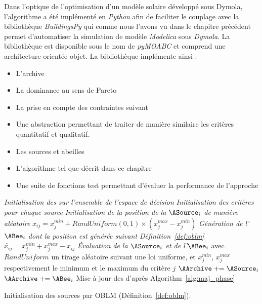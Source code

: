 Dans l’optique de l’optimisation d’un modèle solaire développé sous Dymola, l’algorithme
a été implémenté en \emph{Python} afin de faciliter le couplage avec la bibliothèque
\emph{BuildingsPy} qui comme nous l’avons vu dans le chapitre précédent permet d’automatiser
la simulation de modèle \emph{Modelica} sous \emph{Dymola}. La bibliothèque est
disponible sous le nom de \emph{pyMOABC} et comprend une architecture orientée objet.
La bibliothèque implémente ainsi :
\begin{itemize}
  \item L’archive
  \item La dominance au sens de Pareto
  \item La prise en compte des contraintes suivant \cite{Woldesenbet20073077}
  \item Une abstraction permettant de traiter de manière similaire les critères quantitatif et qualitatif.
  \item Les sources et abeilles
  \item L’algorithme tel que décrit dans ce chapitre
  \item Une suite de fonctions test permettant d’évaluer la performance de l’approche
\end{itemize}


\begin{algorithm}\label{alg:init_phase}
  \SetAlgoVlined
  \emph{Initialisation des \ASources sur l’ensemble de l’espace de décision}\;
  {
    \emph{Initialisation des critères pour chaque source}\;
    {
       \emph{Initialisation de la position de la $\ASource_{i}$ de manière aléatoire}\;
      \Indp
      $x_{ij} = x_{j}^{min} + RandUniform(0, 1) \times (x_{j}^{max} - x_{j}^{min})$\;
      \Indm
      \BlankLine
        \emph{Génération de l’$\ABee_{i}$ dont la position est générée suivant Définition~\ref{def:oblm}}\;
      \Indp
      $ \check{x_{ij}} = x_{j}^{min} + x_{j}^{max} - x_{ij}$\;
      \Indm
      \BlankLine
       \emph{Évaluation de la $\ASource_{i}$ et de l’$\ABee_{i}$}\;
      \BlankLine
      avec $RandUniform$ un tirage aléatoire suivant une loi uniforme, et $x_{j}^{min}$, $x_{j}^{max}$
      respectivement le minimum et le maximum du critère $j$\;
    }
    {
      $\AArchive \pluseq \ASource_{i}$\;
    }
    {
      $\AArchive \pluseq \ABee_{i}$\;
    }
  }
  Mise à jour des \ASources d’après Algorithm~\ref{alg:maj_phase}\;
  \caption{Initialisation des sources par OBLM (Définition~\ref{def:oblm}).}
\end{algorithm}

